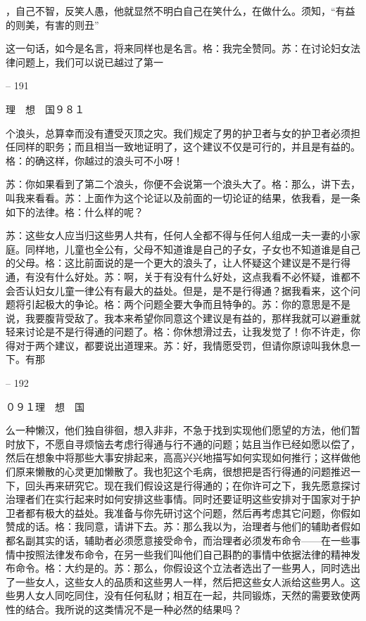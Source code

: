 \documentclass[11pt,oneside]{book}
\begin{document}
\begin{common-format}
    ，自己不智，反笑人愚，他就显然不明白自己在笑什么，在做什么。须知，“有益的则美，有害的则丑”

    这一句话，如今是名言，将来同样也是名言。格：我完全赞同。苏：在讨论妇女法律问题上，我们可以说已越过了第一

    

-- 191

    理　想　国９８１

    个浪头，总算幸而没有遭受灭顶之灾。我们规定了男的护卫者与女的护卫者必须担任同样的职务；而且相当一致地证明了，这个建议不仅是可行的，并且是有益的。格：的确这样，你越过的浪头可不小呀！

    苏：你如果看到了第二个浪头，你便不会说第一个浪头大了。格：那么，讲下去，叫我来看看。苏：上面作为这个论证以及前面的一切论证的结果，依我看，是一条如下的法律。格：什么样的呢？

    苏：这些女人应当归这些男人共有，任何人全都不得与任何人组成一夫一妻的小家庭。同样地，儿童也全公有，父母不知道谁是自己的子女，子女也不知道谁是自己的父母。格：这比前面说的是一个更大的浪头了，让人怀疑这个建议是不是行得通，有没有什么好处。苏：啊，关于有没有什么好处，这点我看不必怀疑，谁都不会否认妇女儿童一律公有有最大的益处。但是，是不是行得通？据我看来，这个问题将引起极大的争论。格：两个问题全要大争而且特争的。苏：你的意思是不是说，我要腹背受敌了。我本来希望你同意这个建议是有益的，那样我就可以避重就轻来讨论是不是行得通的问题了。格：你休想滑过去，让我发觉了！你不许走，你得对于两个建议，都要说出道理来。苏：好，我情愿受罚，但请你原谅叫我休息一下。有那

    

-- 192

    ０９１理　想　国

    么一种懒汉，他们独自徘徊，想入非非，不急于找到实现他们愿望的方法，他们暂时放下，不愿自寻烦恼去考虑行得通与行不通的问题；姑且当作已经如愿以偿了，然后在想象中将那些大事安排起来，高高兴兴地描写如何实现如何推行；这样做他们原来懒散的心灵更加懒散了。我也犯这个毛病，很想把是否行得通的问题推迟一下，回头再来研究它。现在我们假设这是行得通的；在你许可之下，我先愿意探讨治理者们在实行起来时如何安排这些事情。同时还要证明这些安排对于国家对于护卫者都有极大的益处。我准备与你先研讨这个问题，然后再考虑其它问题，你假如赞成的话。格：我同意，请讲下去。苏：那么我以为，治理者与他们的辅助者假如都名副其实的话，辅助者必须愿意接受命令，而治理者必须发布命令——在一些事情中按照法律发布命令，在另一些我们叫他们自己斟酌的事情中依据法律的精神发布命令。格：大约是的。苏：那么，你假设这个立法者选出了一些男人，同时选出了一些女人，这些女人的品质和这些男人一样，然后把这些女人派给这些男人。这些男人女人同吃同住，没有任何私财；相互在一起，共同锻炼，天然的需要致使两性的结合。我所说的这类情况不是一种必然的结果吗？


\end{common-format}
\end{document}
